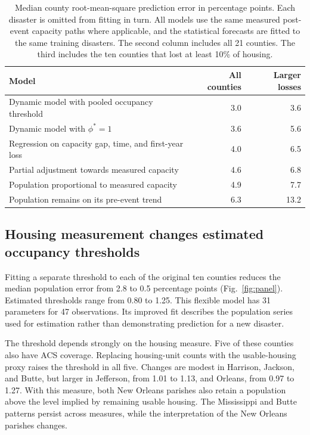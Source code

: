 \documentclass[11pt]{article}
\begin{document}
\begin{table}[tbp]
\centering\small
\caption{Median county root-mean-square prediction error in percentage points. Each disaster is omitted from fitting in turn. All models use the same measured post-event capacity paths where applicable, and the statistical forecasts are fitted to the same training disasters. The second column includes all 21 counties. The third includes the ten counties that lost at least 10\% of housing.}
\label{tab:heldout_summary}
\begin{tabular}{@{}p{8.0cm}rr@{}}
\toprule
Model & All counties & Larger losses\\
\midrule
Dynamic model with pooled occupancy threshold & 3.0 & 3.6\\
Dynamic model with $\phi^*=1$ & 3.6 & 5.6\\
Regression on capacity gap, time, and first-year loss & 4.0 & 6.5\\
Partial adjustment towards measured capacity & 4.6 & 6.8\\
Population proportional to measured capacity & 4.9 & 7.7\\
Population remains on its pre-event trend & 6.3 & 13.2\\
\bottomrule
\end{tabular}
\end{table}

\subsection*{Housing measurement changes estimated occupancy thresholds}

Fitting a separate threshold to each of the original ten counties reduces the median population error from 2.8 to 0.5 percentage points (Fig.~\ref{fig:panel}). Estimated thresholds range from 0.80 to 1.25. This flexible model has 31 parameters for 47 observations. Its improved fit describes the population series used for estimation rather than demonstrating prediction for a new disaster.

The threshold depends strongly on the housing measure. Five of these counties also have ACS coverage. Replacing housing-unit counts with the usable-housing proxy raises the threshold in all five. Changes are modest in Harrison, Jackson, and Butte, but larger in Jefferson, from 1.01 to 1.13, and Orleans, from 0.97 to 1.27. With this measure, both New Orleans parishes also retain a population above the level implied by remaining usable housing. The Mississippi and Butte patterns persist across measures, while the interpretation of the New Orleans parishes changes.
\end{document}
